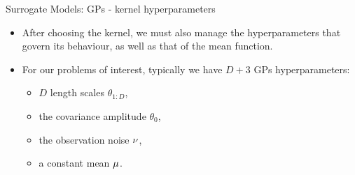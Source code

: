 %
%
%
 
\begin{frame}[c]{Surrogate Models: GPs - kernel hyperparameters}

\begin{itemize}
    \item After choosing the kernel, we must also manage the hyperparameters that govern its behaviour, as well as that of the mean function.  \pause
    \item For our problems of interest, typically we have $D + 3$ GPs hyperparameters:  
    \begin{itemize}
        \item $D$ length scales $\theta_{1:D}$, 
        \item the covariance amplitude $\theta_{0}$, 
        \item the observation noise $\nu$, 
        \item a constant mean $\mu$. 
    \end{itemize}
\end{itemize}

\end{frame}

